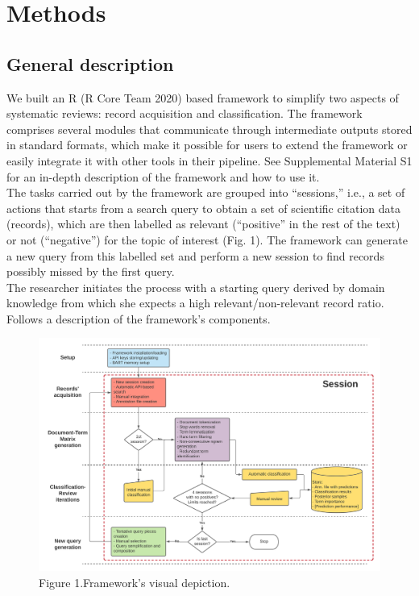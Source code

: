 \documentclass{article}
\begin{document}
\hypertarget{methods}{%
\section{Methods}\label{methods}}

\hypertarget{general-description}{%
\subsection{General description}\label{general-description}}

We built an R (R Core Team 2020) based framework to simplify two aspects
of systematic reviews: record acquisition and classification. The
framework comprises several modules that communicate through
intermediate outputs stored in standard formats, which make it possible
for users to extend the framework or easily integrate it with other
tools in their pipeline. See Supplemental Material S1 for an in-depth
description of the framework and how to use it.\\
The tasks carried out by the framework are grouped into ``sessions,''
i.e., a set of actions that starts from a search query to obtain a set
of scientific citation data (records), which are then labelled as
relevant (``positive'' in the rest of the text) or not (``negative'')
for the topic of interest (Fig. 1). The framework can generate a new
query from this labelled set and perform a new session to find records
possibly missed by the first query.\\
The researcher initiates the process with a starting query derived by
domain knowledge from which she expects a high relevant/non-relevant
record ratio.\\
Follows a description of the framework's components.\\

\begin{figure}
\includegraphics[width=1\linewidth]{methods_diagram} \caption{Figure 1.Framework's visual depiction.}\label{fig:method_diagram}
\end{figure}
\end{document}
